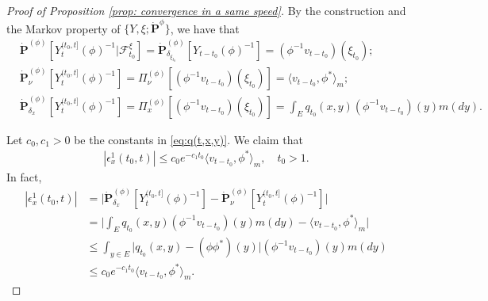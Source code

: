 \begin{proof}[Proof of Proposition \ref{prop: convergence in a same speed}]
	By the construction and the Markov property of $\{Y,\xi; \dot {\mathbf P}^{\phi}\}$, we have that
\begin{align}
	\label{eq: some equations for PY-1-1}
	&\dot{\mathbf P}^{(\phi)} [Y_t^{(t_0,t]}(\phi)^{-1}|\mathscr F^\xi_{t_0}]
	= \dot{\mathbf P}_{\delta_{\xi_{t_0}}}^{(\phi)}  [Y_{t-t_0}(\phi)^{-1}]
	= (\phi^{-1}v_{t-t_0})(\xi_{t_0});
	\\ \label{eq: some equations for PY-1-2}
	&\dot{\mathbf P}_\nu^{(\phi)}[Y_t^{(t_0,t]}(\phi)^{-1}]
	= \Pi_{\nu}^{(\phi)}[(\phi^{-1}v_{t-t_0})(\xi_{t_0}) ]
	= \langle v_{t-t_0},\phi^* \rangle_m;
	\\ \label{eq: some equations for PY-1-3}
	&\dot{\mathbf P}_{\delta_x}^{(\phi)}[Y_t^{(t_0,t]}(\phi)^{-1}]
	= \Pi_x^{(\phi)}[(\phi^{-1}v_{t-t_0})(\xi_{t_0}) ]
	=  \int_E  q_{t_0}(x,y)(\phi^{-1}v_{t-t_0})(y) m(dy).
\end{align}

	Let  $c_0, c_1>0$ be the constants in \eqref{eq:q(t,x,y)}.
	We claim that
\begin{align}\label{eq: bound for epsilon1}
	|\epsilon_x^1(t_0,t)|
	\leq c_0 e^{-c_1 t_0}\langle v_{t-t_0},\phi^* \rangle_m,
    \quad t_0 > 1.
\end{align}
	In fact,
\begin{align}
	|\epsilon_x^1(t_0,t)|
	& = \big| \dot {\mathbf P}_{\delta_x}^{(\phi)} [Y^{(t_0,t]}_t(\phi)^{-1}] - \dot {\mathbf P}_\nu^{(\phi)} [Y^{(t_0,t]}_t(\phi)^{-1}] \big| \\
	& = \Big|  \int_E  q_{t_0}(x,y)(\phi^{-1}v_{t-t_0})(y) m(dy) - \langle v_{t-t_0},\phi^* \rangle_m \Big|\\
	& \leq \int_{y\in E} \big| q_{t_0}(x,y) - (\phi\phi^*)(y) \big| (\phi^{-1}v_{t-t_0})(y) m(dy)\\
	& \leq c_0 e^{-c_1 t_0}\langle v_{t-t_0},\phi^* \rangle_m .
\end{align}


\end{proof}
